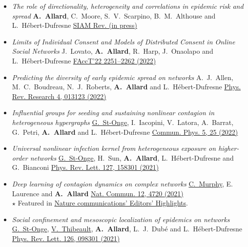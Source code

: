 \documentclass[11pt]{article}
\begin{document}
\begin{itemize}[itemsep=0.5em]\small
%
  \item \textit{The role of directionality, heterogeneity and correlations in epidemic risk and spread}\split
  \textbf{A.~Allard}, C.~Moore, S.~V.~Scarpino, B.~M.~Althouse and L.~H\'ebert-Dufresne\split
  \href{https://arxiv.org/abs/2005.11283}{SIAM Rev. (in press)}
%
  \item \textit{Limits of Individual Consent and Models of Distributed Consent in Online Social Networks}\split
  J.~Lovato, \textbf{A.~Allard}, R.~Harp, J.~Onaolapo and L.~H\'ebert-Dufresne\split
  \href{https://doi.org/10.1145/3531146.3534640}{FAccT'22 2251--2262 (2022)}
%
  \item \textit{Predicting the diversity of early epidemic spread on networks}\split
  A.~J.~Allen, M.~C.~Boudreau, N.~J.~Roberts, \textbf{A.~Allard} and L.~H\'ebert-Dufresne\split
  \href{https://doi.org/10.1103/PhysRevResearch.4.013123}{Phys. Rev. Research 4, 013123 (2022)}
%
  \item \textit{Influential groups for seeding and sustaining nonlinear contagion in heterogeneous hypergraphs}\split
  \uline{G.~St-Onge}, I.~Iacopini, V.~Latora, A.~Barrat, G.~Petri, \textbf{A.~Allard} and L.~H\'ebert-Dufresne\split
  \href{https://doi.org/10.1038/s42005-021-00788-w}{Commun. Phys. 5, 25 (2022)}
%
  \item \textit{Universal nonlinear infection kernel from heterogeneous exposure on higher-order networks}\split
  \uline{G.~St-Onge}, H.~Sun, \textbf{A.~Allard}, L.~H\'ebert-Dufresne and G.~Bianconi\split
  \href{https://doi.org/10.1103/PhysRevLett.127.158301}{Phys. Rev. Lett. 127, 158301 (2021)}
%
  \item \textit{Deep learning of contagion dynamics on complex networks}\split
  \uline{C.~Murphy}, E. Laurence and \textbf{A.~Allard}\split
  \href{https://arxiv.org/abs/2006.05410}{Nat. Commun. 12, 4720 (2021)}\\
  {\footnotesize $\star$ Featured in \href{https://www.nature.com/ncomms/editorshighlights}{Nature communications' Editors' Highlights}.}
%
  \item \textit{Social confinement and mesoscopic localization of epidemics on networks}\split
  \uline{G.~St-Onge}, \uline{V.~Thibeault}, \textbf{A.~Allard}, L.~J.~Dub\'e and L.~H\'ebert-Dufresne\split
  \href{http://doi.org/10.1103/PhysRevLett.126.098301}{Phys. Rev. Lett. 126, 098301 (2021)}

\end{itemize}
\end{document}
